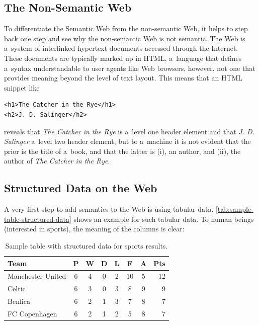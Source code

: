 \subsection{The Non-Semantic Web} \label{sec:non-semantic-web}
To differentiate the Semantic Web from the non-semantic Web, it helps to step back one step and
see why the non-semantic Web is not semantic.
The Web is a~system of interlinked hypertext documents accessed through the Internet.
These documents are typically marked up in HTML, a~language that defines a~syntax
understandable to user agents like Web browsers, however,
not one that provides meaning beyond the level of text layout.
This means that an HTML snippet like
\begin{verbatim}
<h1>The Catcher in the Rye</h1>
<h2>J. D. Salinger</h2>
\end{verbatim}
reveals that \emph{The Catcher in the Rye} is a~level one header element and
that \emph{J. D. Salinger} a~level two header element,
but to a~machine it is not evident that the prior is the title of a~book,
and that the latter is (i), an author, and (ii), the author of \emph{The Catcher in the Rye}.

\subsection{Structured Data on the Web}
A very first step to add semantics to the Web is using tabular data.
\autoref{tab:sample-table-structured-data} shows an example for such tabular data.
To human beings (interested in sports), the meaning of the columns is clear:

\begin{table}[b]
 \begin{center}
  \begin{tabular}{l*{6}{c}r}
Team              & P & W & D & L & F  & A & Pts \\
\hline
Manchester United & 6 & 4 & 0 & 2 & 10 & 5 & 12  \\
Celtic            & 6 & 3 & 0 & 3 &  8 & 9 &  9  \\
Benfica           & 6 & 2 & 1 & 3 &  7 & 8 &  7  \\
FC Copenhagen     & 6 & 2 & 1 & 2 &  5 & 8 &  7  \\
  \end{tabular}
\caption{Sample table with structured data for sports results.}
\label{tab:sample-table-structured-data}
 \end{center}
\end{table}

